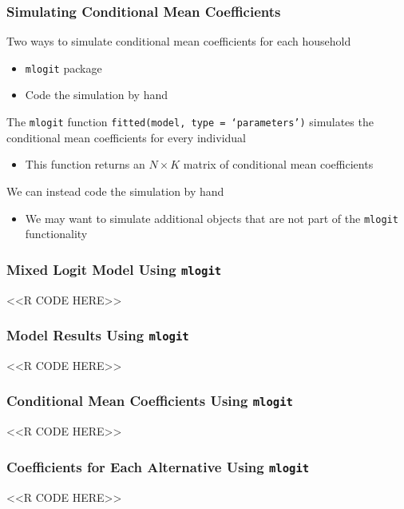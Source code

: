 \documentclass{beamer}
\begin{document}
\begin{frame}\frametitle{Simulating Conditional Mean Coefficients}
    Two ways to simulate conditional mean coefficients for each household
    \begin{itemize}
        \item \texttt{mlogit} package
        \item Code the simulation by hand
    \end{itemize}
    \vspace{2ex}
    The \texttt{mlogit} function \texttt{fitted(model, type = `parameters')} simulates the conditional mean coefficients for every individual
    \begin{itemize}
        \item This function returns an $N \times K$ matrix of conditional mean coefficients
    \end{itemize}
    \vspace{2ex}
    We can instead code the simulation by hand
    \begin{itemize}
        \item We may want to simulate additional objects that are not part of the \texttt{mlogit} functionality
    \end{itemize}
\end{frame}

\begin{frame}[fragile]\frametitle{Mixed Logit Model Using \texttt{mlogit}}
    <<R CODE HERE>>
\end{frame}

\begin{frame}[fragile]\frametitle{Model Results Using \texttt{mlogit}}
    <<R CODE HERE>>
\end{frame}

\begin{frame}[fragile]\frametitle{Conditional Mean Coefficients Using \texttt{mlogit}}
    <<R CODE HERE>>
\end{frame}

\begin{frame}[fragile]\frametitle{Coefficients for Each Alternative Using \texttt{mlogit}}
    <<R CODE HERE>>
\end{frame}
\end{document}
